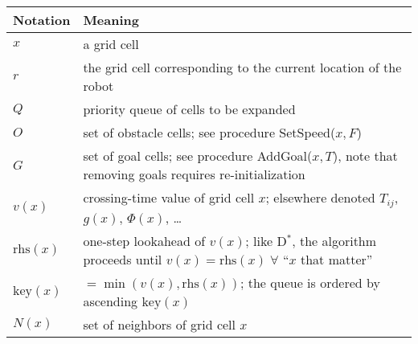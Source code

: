 \documentclass[twocolumn]{article}
\newcommand{\rhs}{\text{rhs}}
\newcommand{\key}{\text{key}}
\begin{document}
\begin{table}
  \centering
  \begin{tabular}{@{}p{}p{}@{}}
    \toprule
    Notation & Meaning \\
    \midrule
    $x$       & a grid cell \\
    $r$       & the grid cell corresponding to the current location of the robot \\
    $Q$       & priority queue of cells to be expanded \\
    $O$       & set of obstacle cells; see procedure SetSpeed($x, F$) \\
    $G$       & set of goal cells; see procedure AddGoal($x, T$), note that removing goals requires re-initialization \\
    $v(x)$    & crossing-time value of grid cell $x$; elsewhere denoted $T_{ij}$, $g(x)$, $\Phi(x)$, \ldots \\
    $\rhs(x)$ & one-step lookahead of $v(x)$; like D$^\ast$, the algorithm proceeds until $v(x) = \rhs(x) \;\forall$ ``$x$ that matter'' \\
    $\key(x)$ &  $= \min (v(x), \rhs(x))$; the queue is ordered by ascending $\key(x)$ \\
    $N(x)$    & set of neighbors of grid cell $x$ \\
    \bottomrule
  \end{tabular}
\end{table}
\end{document}
